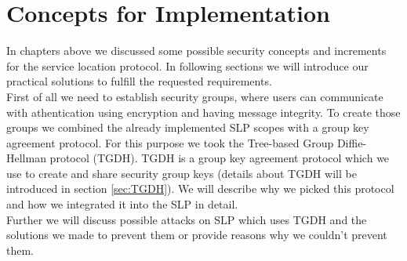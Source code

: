 \newpage
\section{Concepts for Implementation}\label{sec:concepts}
In chapters above we discussed some possible security concepts and increments for the service location protocol. In following sections we will introduce our practical solutions to fulfill the requested requirements.\\
First of all we need to establish security groups, where users can communicate with athentication using encryption and having message integrity. To create those groups we combined the already implemented SLP scopes with a group key agreement protocol. For this purpose we took the Tree-based Group Diffie-Hellman protocol (TGDH). TGDH is a group key agreement protocol which we use to create and share security group keys (details about TGDH will be introduced in section \ref{sec:TGDH}). We will describe why we picked this protocol and how we integrated it into the SLP in detail.\\
Further we will discuss possible attacks on SLP which uses TGDH and the solutions we made to prevent them or provide reasons why we couldn't prevent them.

